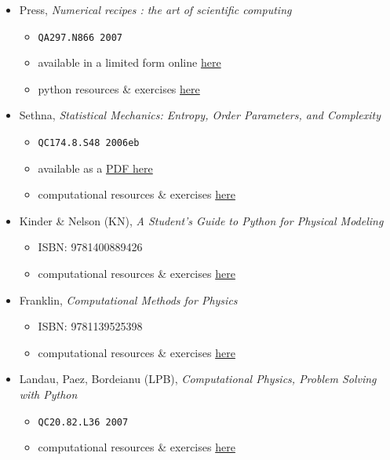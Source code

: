   \begin{itemize}
    \item Press, \textit{Numerical recipes : the art of scientific computing}
    \begin{itemize}
      \item \texttt{QA297.N866 2007} 
      \item available in a limited form online \href{http://numerical.recipes/}{here} 
      \item python resources \&  exercises \href{http://numerical.recipes/nr3_python_tutorial.html}{here}
    \end{itemize}
    \item Sethna, \textit{Statistical Mechanics: Entropy, Order Parameters, and Complexity} 
    \begin{itemize}
      \item \texttt{QC174.8.S48 2006eb} 
      \item available as a \href{https://sethna.lassp.cornell.edu/StatMech/EntropyOrderParametersComplexity20.pdf}{PDF here} 
      \item computational resources \&  exercises \href{https://sethna.lassp.cornell.edu/StatMech/EOPCHintsAndMaterials.html}{here}
    \end{itemize}
    \item Kinder \& Nelson (KN), \textit{A Student's Guide to Python for Physical Modeling} 
    \begin{itemize}
      \item ISBN: 9781400889426 
      \item computational resources \&  exercises \href{http://physicalmodelingwithpython.blogspot.com/}{here}
    \end{itemize}
    \item Franklin, \textit{Computational Methods for Physics} 
    \begin{itemize}
      \item ISBN: 9781139525398
      \item computational resources \&  exercises \href{https://people.reed.edu/~jfrankli/downloads-2/}{here}
    \end{itemize}
    \item Landau, Paez, Bordeianu (LPB), \textit{Computational Physics, Problem Solving with Python} 
    \begin{itemize}
      \item \texttt{QC20.82.L36 2007} 
      \item computational resources \& exercises \href{http://physics.oregonstate.edu/~landaur/Books/CPbook/}{here}

\end{itemize}
\end{itemize}
